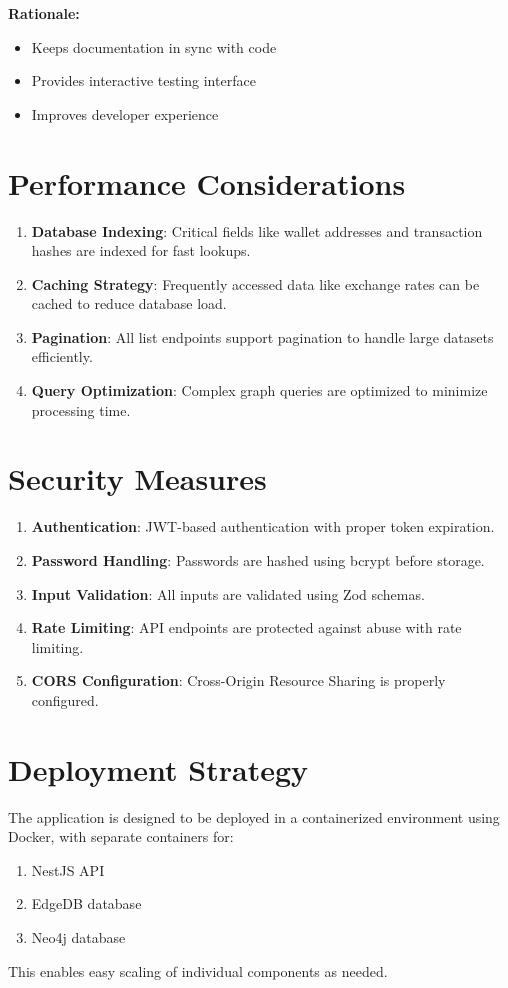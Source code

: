 \textbf{Rationale:}
\begin{itemize}
\item Keeps documentation in sync with code
\item Provides interactive testing interface
\item Improves developer experience
\end{itemize}
\section{Performance Considerations}
\begin{enumerate}
\item \textbf{Database Indexing}: Critical fields like wallet addresses and transaction hashes are indexed for fast lookups.
\item \textbf{Caching Strategy}: Frequently accessed data like exchange rates can be cached to reduce database load.
\item \textbf{Pagination}: All list endpoints support pagination to handle large datasets efficiently.
\item \textbf{Query Optimization}: Complex graph queries are optimized to minimize processing time.
\end{enumerate}
\section{Security Measures}
\begin{enumerate}
    \item \textbf{Authentication}: JWT-based authentication with proper token expiration.
    \item \textbf{Password Handling}: Passwords are hashed using bcrypt before storage.
    \item \textbf{Input Validation}: All inputs are validated using Zod schemas.
    \item \textbf{Rate Limiting}: API endpoints are protected against abuse with rate limiting.
    \item \textbf{CORS Configuration}: Cross-Origin Resource Sharing is properly configured.
\end{enumerate}
\section{Deployment Strategy}
The application is designed to be deployed in a containerized environment using Docker, with separate containers for:
\begin{enumerate}
    \item NestJS API
    \item EdgeDB database
    \item Neo4j database
\end{enumerate}
This enables easy scaling of individual components as needed.